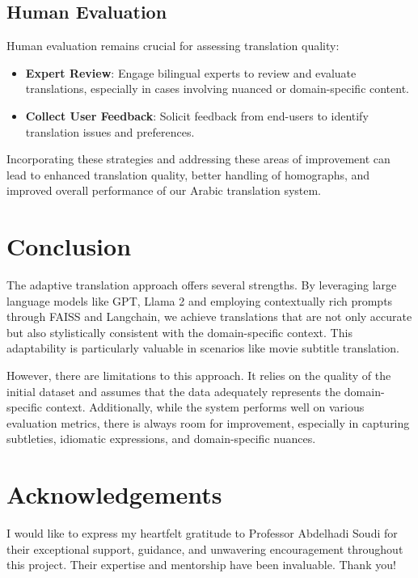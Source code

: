 \documentclass[12pt]{article}
\begin{document}
\subsection{Human Evaluation}

Human evaluation remains crucial for assessing translation quality:

\begin{itemize}
	\item \textbf{Expert Review}: Engage bilingual experts to review and evaluate translations, especially in cases involving nuanced or domain-specific content.
	\item \textbf{Collect User Feedback}: Solicit feedback from end-users to identify translation issues and preferences.
\end{itemize}

Incorporating these strategies and addressing these areas of improvement can lead to enhanced translation quality, better handling of homographs, and improved overall performance of our Arabic translation system.


\section{Conclusion}
The adaptive translation approach offers several strengths. By leveraging large language models like GPT, Llama 2 and employing contextually rich prompts through FAISS and Langchain, we achieve translations that are not only accurate but also stylistically consistent with the domain-specific context. This adaptability is particularly valuable in scenarios like movie subtitle translation.

However, there are limitations to this approach. It relies on the quality of the initial dataset and assumes that the data adequately represents the domain-specific context. Additionally, while the system performs well on various evaluation metrics, there is always room for improvement, especially in capturing subtleties, idiomatic expressions, and domain-specific nuances.

\section{Acknowledgements}

I would like to express my heartfelt gratitude to Professor Abdelhadi Soudi for their exceptional support, guidance, and unwavering encouragement throughout this project. Their expertise and mentorship have been invaluable. Thank you!

\newpage

\end{document}
